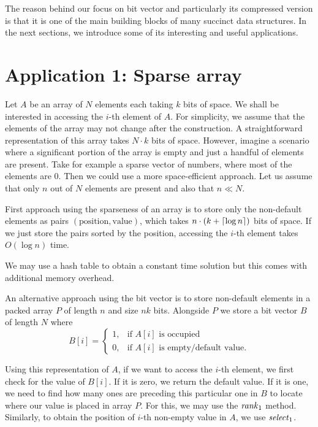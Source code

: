 The reason behind our focus on bit vector and particularly its compressed version
is that it is one of the main building blocks of many succinct data structures.
In the next sections, we introduce some of its interesting and useful applications.

\section{Application 1: Sparse array}

Let $A$ be an array of $N$ elements each taking $k$ bits of space. We shall be interested in
accessing the $i$-th element of $A$. For simplicity, we assume that the elements of the array may
not change after the construction. A straightforward representation of this array takes $N\cdot k$
bits of space. However, imagine a scenario where a significant portion of the array is empty
and just a handful of elements are present. Take for example a sparse vector of numbers,
where most of the elements are 0. Then we could use a more space-efficient approach.
Let us assume that only $n$ out of $N$ elements are present and also that $n\ll N$.

First approach using the sparseness of an array is to store only the non-default elements as
pairs $(\text{position}, \text{value})$, which takes $n\cdot (k+\left\lceil \log n \right\rceil)$ bits of space.
If we just store the pairs sorted by the position, accessing the $i$-th element takes $O(\log n)$ time.

We may use a hash table to obtain a constant time solution but this comes with additional
memory overhead.

An alternative approach using the bit vector is to store non-default elements in
a packed array $P$ of length $n$ and size $nk$ bits. Alongside $P$ we store a bit vector $B$ of length
$N$ where
\[
   B[i]=
\begin{cases}
   1,& \text{if $A[i]$ is occupied} \\
   0,& \text{if $A[i]$ is empty/default value.}
\end{cases}
\]

Using this representation of $A$, if we want to access the $i$-th element, we first check for
the value of $B[i]$. If it is zero, we return the default value. If it is one, we need to find
how many ones are preceding this particular one in $B$ to locate where our value is placed in
array $P$. For this, we may use the $\mathit{rank}_1$ method. Similarly, to obtain the position of $i$-th
non-empty value in $A$, we use $\mathit{select}_1$.


